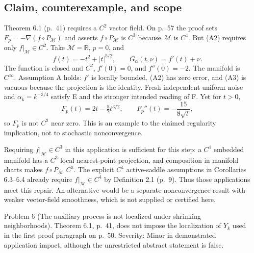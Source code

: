 \documentclass[10pt]{article}
\begin{document}
\subsection*{Claim, counterexample, and scope}
Theorem 6.1 (p. 41) requires a \(C^2\) vector field. On p. 57 the proof sets \(F_p=-\nabla(f\circ P_\mathcal M)\) and asserts \(f\circ P_\mathcal M\) is \(C^3\) because \(\mathcal M\) is \(C^4\). But (A2) requires only \(f|_\mathcal M\in C^2\). Take \(\mathcal M=\mathbb R\), \(p=0\), and \[f(t)=-t^2+|t|^{5/2},\qquad G_\alpha(t,\nu)=f'(t)+\nu .\] The function is closed and \(C^2\), \(f'(0)=0\), and \(f''(0)=-2\). The manifold is \(C^\infty\). Assumption A holds: \(f'\) is locally bounded, (A2) has zero error, and (A3) is vacuous because the projection is the identity. Fresh independent uniform noise and \(\alpha_k=k^{-3/4}\) satisfy E and the stronger intended reading of F. Yet for \(t>0\), \[F_p(t)=2t-\tfrac52t^{3/2},
 \qquad F_p''(t)=-\frac{15}{8\sqrt t},\] so \(F_p\) is not \(C^2\) near zero. This is an example to the claimed regularity implication, not to stochastic nonconvergence.\par
Requiring \(f|_\mathcal M\in C^3\) in this application is sufficient for this step: a \(C^4\) embedded manifold has a \(C^3\) local nearest-point projection, and composition in manifold charts makes \(f\circ P_\mathcal M\) \(C^3\). The explicit \(C^4\) active-saddle assumptions in Corollaries 6.3–6.4 already require \(f|_\mathcal M\in C^4\) by Definition 2.1 (p. 9). Thus those applications meet this repair. An alternative would be a separate nonconvergence result with weaker vector-field smoothness, which is not supplied or certified here.\par
Problem 6 (The auxiliary process is not localized under shrinking neighborhoods).  Theorem 6.1, p. 41, does not impose the localization of \(Y_k\) used in the first proof paragraph on p. 50. Severity: Minor in demonstrated application impact, although the unrestricted abstract statement is false.\par
\end{document}
